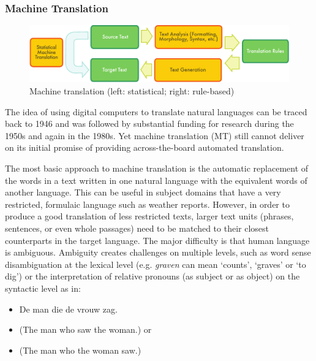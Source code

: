 \begin{multicols}{2}
\subsubsection{Machine Translation}

\begin{figure}[htb]
  \center
  \includegraphics[width=\textwidth]{../_media/english/machine_translation}
  \caption{Machine translation (left: statistical; right: rule-based)}
  \label{fig:mtarch_en}
\end{figure}

The idea of using digital computers to translate natural languages can be traced back to 1946 and was followed by substantial funding for research during the 1950s and again in the 1980s.
Yet machine translation (MT) still cannot deliver on its initial promise of providing across-the-board automated translation.


The most basic approach to machine translation is the automatic replacement of the words in a text written in one natural language with the equivalent words of another language. This can be useful in subject domains that have a very restricted, formulaic language such as weather reports.
However, in order to produce a good translation of less restricted texts, larger text units (phrases, sentences, or even whole passages) need to be matched to their closest counterparts in the target language. The major difficulty is that human language is ambiguous. Ambiguity creates challenges on multiple levels, such as word sense disambiguation at the lexical level (e.g. \textit{graven} can mean `counts',  `graves' or `to dig')  or the interpretation of relative pronouns (as subject or as object) on the syntactic level as in:

\begin{itemize}
\item De man die de vrouw zag.
\item (The man who saw the woman.) or
\item (The man who the woman saw.)
\end{itemize}


\end{multicols}
